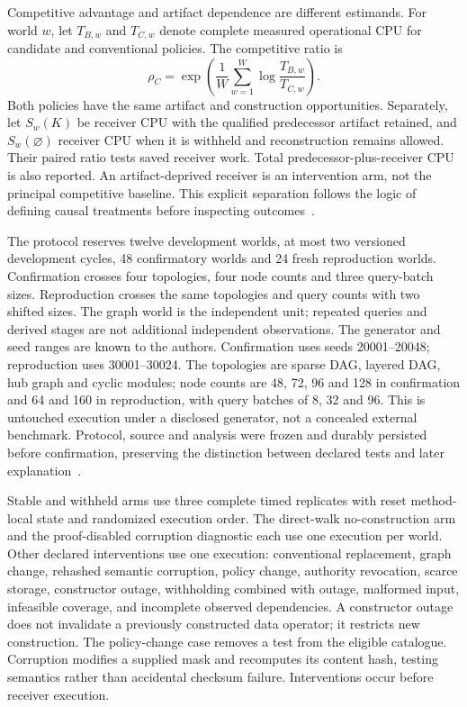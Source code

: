 \documentclass[11pt,letterpaper]{article}
\begin{document}
Competitive advantage and artifact dependence are different estimands. For world $w$, let $T_{B,w}$ and $T_{C,w}$ denote complete measured operational CPU for candidate and conventional policies. The competitive ratio is
\begin{equation}
 \rho_C=\exp\left(\frac{1}{W}\sum_{w=1}^{W}
 \log\frac{T_{B,w}}{T_{C,w}}\right).
\end{equation}
Both policies have the same artifact and construction opportunities. Separately, let $S_w(K)$ be receiver CPU with the qualified predecessor artifact retained, and $S_w(\varnothing)$ receiver CPU when it is withheld and reconstruction remains allowed. Their paired ratio tests saved receiver work. Total predecessor-plus-receiver CPU is also reported. An artifact-deprived receiver is an intervention arm, not the principal competitive baseline. This explicit separation follows the logic of defining causal treatments before inspecting outcomes~\cite{rubin2008design}.

The protocol reserves twelve development worlds, at most two versioned development cycles, 48 confirmatory worlds and 24 fresh reproduction worlds. Confirmation crosses four topologies, four node counts and three query-batch sizes. Reproduction crosses the same topologies and query counts with two shifted sizes. The graph world is the independent unit; repeated queries and derived stages are not additional independent observations. The generator and seed ranges are known to the authors. Confirmation uses seeds 20001--20048; reproduction uses 30001--30024. The topologies are sparse DAG, layered DAG, hub graph and cyclic modules; node counts are 48, 72, 96 and 128 in confirmation and 64 and 160 in reproduction, with query batches of 8, 32 and 96. This is untouched execution under a disclosed generator, not a concealed external benchmark. Protocol, source and analysis were frozen and durably persisted before confirmation, preserving the distinction between declared tests and later explanation~\cite{nosek2018preregistration}.

Stable and withheld arms use three complete timed replicates with reset method-local state and randomized execution order. The direct-walk no-construction arm and the proof-disabled corruption diagnostic each use one execution per world. Other declared interventions use one execution: conventional replacement, graph change, rehashed semantic corruption, policy change, authority revocation, scarce storage, constructor outage, withholding combined with outage, malformed input, infeasible coverage, and incomplete observed dependencies. A constructor outage does not invalidate a previously constructed data operator; it restricts new construction. The policy-change case removes a test from the eligible catalogue. Corruption modifies a supplied mask and recomputes its content hash, testing semantics rather than accidental checksum failure. Interventions occur before receiver execution.
\end{document}
